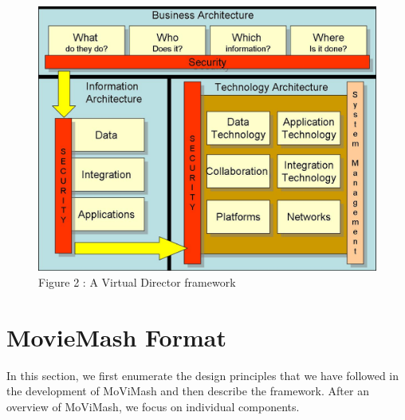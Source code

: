 \documentclass{IEEEtran}
\begin{document}
\begin{figure}
  \includegraphics[width=\linewidth]{Frame.jpg}
  \caption{Figure 2 : A Virtual Director framework}
  \label{Fig2}
\end{figure}
\section{MovieMash Format}
In this section, we first enumerate the design principles that we have followed in the development of MoViMash and then describe the framework. After an overview of MoViMash, we focus on individual components.
\end{document}
